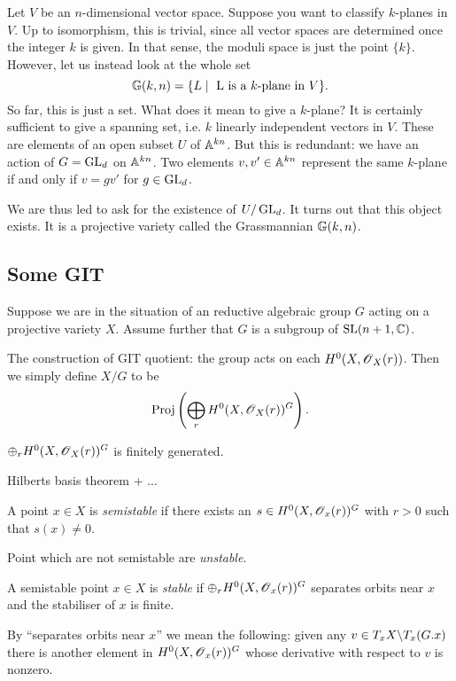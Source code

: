 \documentclass[11pt, english]{article}
\begin{document}
Let $V$ be an $n$-dimensional vector space. Suppose you want to classify $k$-planes in $V$. Up to isomorphism, this is trivial, since all vector spaces are determined once the integer $k$ is given. In that sense, the moduli space is just the point $\{k \}$. However, let us instead look at the whole set
$$ \mathbb{G}(k,n) = \{ L \mid \text{ L is a $k$-plane in $V$} \}.$$
So far, this is just a set. What does it mean to give a $k$-plane? It is certainly sufficient to give a spanning set, i.e. $k$ linearly independent vectors in $V$. These are elements of an open subset $U$ of $\mathbb{A}^{kn}$. But this is redundant: we have an action of $G=\operatorname{GL}_d$ on $\mathbb{A}^{kn}$. Two elements $v,v' \in \mathbb{A}^{kn}$  represent the same $k$-plane if and only if $v =gv'$ for $g \in \operatorname{GL}_d$.

We are thus led to ask for the existence of $U/\operatorname{GL}_d$. It turns out that this object exists. It is a projective variety called the Grassmannian $\mathbb{G}(k,n)$.

\subsection{Some GIT}

\cite{thomas_git}

Suppose we are in the situation of an reductive algebraic group $G$  acting on a projective variety $X$. Assume further that $G$ is a subgroup of $\operatorname{SL}(n+1,\mathbb{C})$.

The construction of GIT quotient: the group acts on each $H^0(X,\operatorname{\mathscr{O}}_X(r))$. Then we simply define $X/G$ to be
$$
\operatorname{Proj}\left(\bigoplus_r H^0(X,\operatorname{\mathscr{O}}_X(r))^G\right).
$$
\begin{lemma}
$\oplus_r H^0(X,\operatorname{\mathscr{O}}_X(r))^G$ is finitely generated.
\end{lemma}
\begin{lemma}
  Hilberts basis theorem + ...
\end{lemma}

\begin{defi}
A point $x \in X$ is \emph{semistable} if there exists an $s \in H^0(X,\operatorname{\mathscr{O}}_x(r))^G$ with $r > 0$ such that $s(x) \neq 0$.
\end{defi}
Point which are not semistable are \emph{unstable}.

\begin{defi}
A semistable point $x  \in X$ is \emph{stable} if $\oplus_r H^0(X,\operatorname{\mathscr{O}}_x(r))^G$ separates orbits near $x$ and the stabiliser of $x$ is finite.
\end{defi}
By ``separates orbits near $x$'' we mean the following: given any $v \in T_xX \backslash T_x(G.x)$ there is another element in $H^0(X,\operatorname{\mathscr{O}}_x(r))^G$ whose derivative with respect to $v$ is nonzero.



\end{document}
